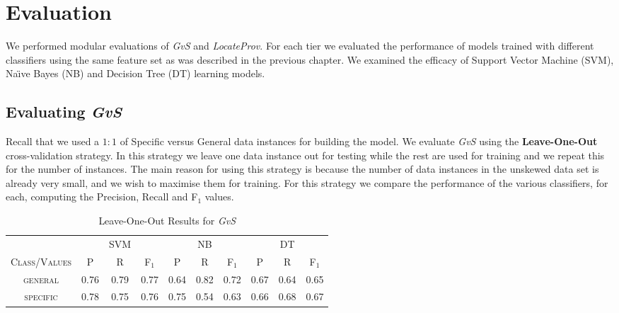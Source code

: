 \chapter{Evaluation}
\label{evaluation}
We performed modular evaluations of {\it GvS} and {\it LocateProv}. For each tier we evaluated the performance of models trained with different classifiers using the same feature set as was described in the previous chapter.  We examined the efficacy of Support Vector Machine (SVM), Na\"{\i}ve Bayes (NB) and Decision Tree (DT) learning models. 

\section{Evaluating {\it GvS}}
\label{eval:first}
Recall that we used a $1:1$ of Specific versus General data instances for building the model.
We evaluate \textit{GvS} using the \textbf{Leave-One-Out} cross-validation strategy. In this strategy we leave one data instance out for testing while the rest are used for training and we repeat this for the number of instances. The main reason for using this strategy is because the number of data instances in the unskewed data set is already very small, and we wish to maximise them for training. For this strategy we compare the performance of the various classifiers, for each, computing the Precision, Recall and F$_1$ values.

\begin{table}[h]
	\center
	\begin{tabular}{ c | c  c  c | c c c | c c c}
		& & SVM & & & NB & & & DT \\
		\textsc{Class/Values} & \textsc{P} & \textsc{R} & \textsc{F$_1$} & \textsc{P} & \textsc{R} & \textsc{F$_1$} & \textsc{P} & \textsc{R} & \textsc{F$_1$} \\
		\hline
		\textsc{general} 			& 0.76  &    0.79   &   0.77 & 0.64   &   0.82   &   0.72 & 0.67  &    0.64  &    0.65 \\
		\textsc{specific} 			& 0.78  &    0.75   &   0.76 & 0.75   &   0.54   &   0.63 & 0.66  &    0.68  &    0.67 \\
	\end{tabular}
	\caption{Leave-One-Out Results for {\it GvS}}
	\label{tab:firsttieresults}
\end{table}

